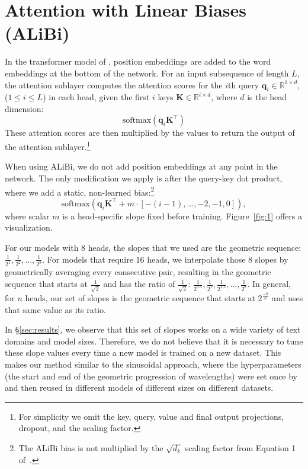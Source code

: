 

\section{Attention with Linear Biases (ALiBi)}
\label{sec:ourmethod}






In the transformer model of \citet{vaswani}, position embeddings are added to the word embeddings at the bottom of the network. %
For an input subsequence of length $L$, the attention sublayer %
computes the attention scores for the $i$th
query $\mathbf{q}_i \in \mathbb{R}^{1\times d}$, ($1 \leq i \leq L$) in each head, given the first $i$ keys $\mathbf{K} \in \mathbb{R}^{i\times d}$, where $d$ is the head dimension:%
\begin{equation*}
\text{softmax}(\mathbf{q}_i \mathbf{K}^\top)
\end{equation*}
These attention scores are then multiplied by the values to return the output of the attention sublayer.\footnote{For simplicity we omit the key, query, value and final output projections, dropout, and the scaling factor.}

When using ALiBi, we do not add position embeddings at any point in the network. %
The only modification we apply is after the query-key dot product, where we add a static, non-learned bias:\footnote{The ALiBi bias is not multiplied by the $\sqrt{d_k}$ scaling factor from Equation 1 of~\citet{vaswani}.}
\begin{equation*}
\text{softmax}(\mathbf{q}_i \mathbf{K}^\top + m \cdot [-(i-1), ..., -2, -1, 0]), 
\end{equation*}
where scalar $m$ is a head-specific slope fixed before training.
Figure~\ref{fig:1} offers a visualization. 

For our models with 8 heads, the slopes that we used are the geometric sequence: %
${\frac{1}{2^1}, \frac{1}{2^2}, ..., \frac{1}{2^8}}$. 
For models that require 16 heads, we interpolate those 8 slopes by geometrically averaging every consecutive pair, resulting in the geometric sequence that starts at $\frac{1}{\sqrt{2}}$ and has the ratio of $\frac{1}{\sqrt{2}}$: ${\frac{1}{2^{0.5}}, \frac{1}{2^1}, \frac{1}{2^{1.5}}, ..., \frac{1}{2^{8}}}$. In general, for $n$ heads, our set of slopes is the geometric sequence that starts at %
$2^{\frac{-8}{n}}$
and uses that same value as its ratio.  


In \S\ref{sec:results}, we observe that this set of slopes works on a wide variety of text domains and model sizes. Therefore, we do not believe that it is necessary to tune these slope values every time a new model is trained on a new dataset. This makes our method similar to the sinusoidal approach, where the hyperparameters (the start and end of the geometric progression of wavelengths) were set once by~\citet{vaswani} and then reused in different models of different sizes on different datasets.  



